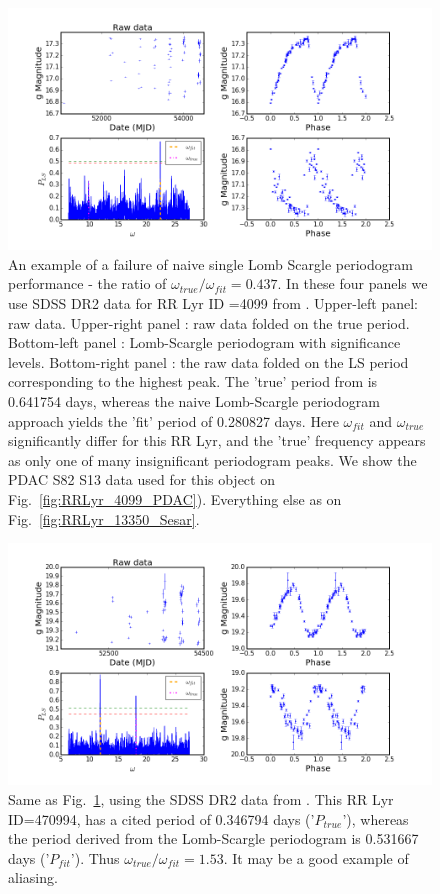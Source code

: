 \documentclass[DM,lsstdraft,toc]{lsstdoc}
\begin{document}
\begin{figure}
\includegraphics[width=\textwidth]{figs/Fig_2_RRLyr_LS_periodogram_ID_4099_g}
\caption{An example of a failure of naive single Lomb Scargle periodogram performance -  the ratio of $\omega_{true} / \omega_{fit} = 0.437$.  In these four panels we use  SDSS DR2  data for RR Lyr ID =4099 from  \citep{2010ApJ...708..717S} . Upper-left panel:  raw data.  Upper-right panel : raw data folded on the true period.  Bottom-left panel : Lomb-Scargle periodogram with significance levels.  Bottom-right panel : the raw data folded  on the LS period corresponding to the highest peak. The 'true' period from \citep{2010ApJ...708..717S} is  0.641754 days, whereas the naive Lomb-Scargle periodogram approach yields the 'fit' period of 0.280827  days. Here $\omega_{fit}$ and $\omega_{true}$ significantly differ for this RR Lyr,  and the 'true' frequency  appears as only one of many insignificant periodogram peaks.  We show the PDAC S82 S13 data used for this object on Fig.~\ref{fig:RRLyr_4099_PDAC}).  Everything else as on Fig.~\ref{fig:RRLyr_13350_Sesar}.}
\label{fig:RRLyr_4099_Sesar}
\end{figure}


\begin{figure}
\includegraphics[width=\textwidth]{figs/Fig_2_RRLyr_LS_periodogram_ID_470994_g}
\caption{Same as Fig.~\ref{fig:RRLyr_4099_Sesar}, using the SDSS DR2 data from \citep{2010ApJ...708..717S}.  This RR Lyr ID=470994, has a cited period of 0.346794  days ('$P_{true}$'), whereas the period derived from the Lomb-Scargle periodogram is 0.531667 days ('$P_{fit}$').  Thus  $\omega_{true} / \omega_{fit} = 1.53$. It may be a  good example of aliasing. }
\label{fig:RRLyr_470994_Sesar}
\end{figure}
\end{document}
